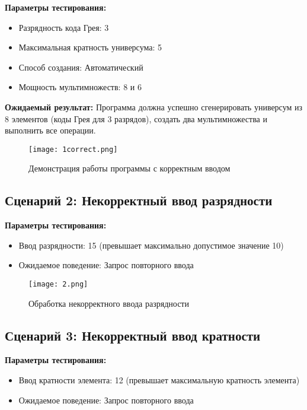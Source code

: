 \documentclass[12pt,a4paper]{article}
\begin{document}
\textbf{Параметры тестирования:}
\begin{itemize}
    \item Разрядность кода Грея: 3
    \item Максимальная кратность универсума: 5
    \item Способ создания: Автоматический
    \item Мощность мультимножеств: 8 и 6
\end{itemize}

\textbf{Ожидаемый результат:} Программа должна успешно сгенерировать универсум из 8 элементов (коды Грея для 3 разрядов), создать два мультимножества и выполнить все операции.

\begin{figure}[h]
    \centering
    \texttt{[image: 1correct.png]}
    \caption{Демонстрация работы программы с корректным вводом}
    \label{fig:correct_input}
\end{figure}

\subsection{Сценарий 2: Некорректный ввод разрядности}

\textbf{Параметры тестирования:}
\begin{itemize}
    \item Ввод разрядности: 15 (превышает максимально допустимое значение 10)
    \item Ожидаемое поведение: Запрос повторного ввода
\end{itemize}

\begin{figure}[h]
    \centering
    \texttt{[image: 2.png]}
    \caption{Обработка некорректного ввода разрядности}
    \label{fig:invalid_bitwidth}
\end{figure}

\subsection{Сценарий 3: Некорректный ввод кратности}

\textbf{Параметры тестирования:}
\begin{itemize}
    \item Ввод кратности элемента: 12 (превышает максимальную кратность элемента)
    \item Ожидаемое поведение: Запрос повторного ввода
\end{itemize}
\end{document}
